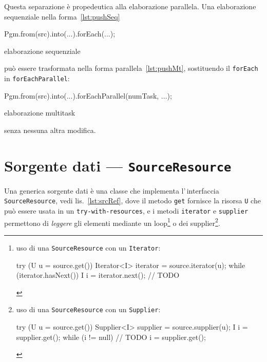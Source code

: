 Questa separazione è propedeutica alla elaborazione parallela.
Una elaborazione sequenziale nella forma~\ref{lst:pushSeq}
\begin{elisting}[!htb]
    \begin{javacode}
        Pgm.from(src).into(...).forEach(...);
    \end{javacode}
    \caption{elaborazione sequenziale}
    \label{lst:pushSeq}
\end{elisting}
può essere trasformata nella forma parallela~\ref{lst:pushMt}, sostituendo il
\texttt{forEach} in \texttt{forEachParallel}:
\begin{elisting}[!htb]
    \begin{javacode}
        Pgm.from(src).into(...).forEachParallel(numTask, ...);
    \end{javacode}
    \caption{elaborazione multitask}
    \label{lst:pushMt}
\end{elisting}
senza nessuna altra modifica.

\VerbatimFootnotes


\section{Sorgente dati --- \texttt{SourceResource}} \label{sec:srcRes}
Una generica sorgente dati è una classe che implementa l'\,interfaccia
\texttt{SourceResource}, vedi lis.~\ref{lst:srcRef}, dove il metodo \texttt{get}
fornisce la risorsa \texttt{U} che può essere usata in un
\texttt{try-with-resources}, e i metodi \texttt{iterator} e \texttt{supplier}
permettono di \textsl{leggere} gli elementi mediante un loop\footnote{%
    uso di una \texttt{SourceResource} con un \texttt{Iterator}:
    \begin{javacode}
        try (U u = source.get()) {
        Iterator<I> iterator = source.iterator(u);
        while (iterator.hasNext()) {
            I i = iterator.next();
            // TODO
        }
    }
    \end{javacode}
} o dei supplier\footnote{%
    uso di una \texttt{SourceResource} con un \texttt{Supplier}:
    \begin{javacode}
        try (U u = source.get()) {
        Supplier<I> supplier = source.supplier(u);
        I i = supplier.get();
        while (i != null) {
            // TODO
            i = supplier.get();
        }
    }
    \end{javacode}
}.

